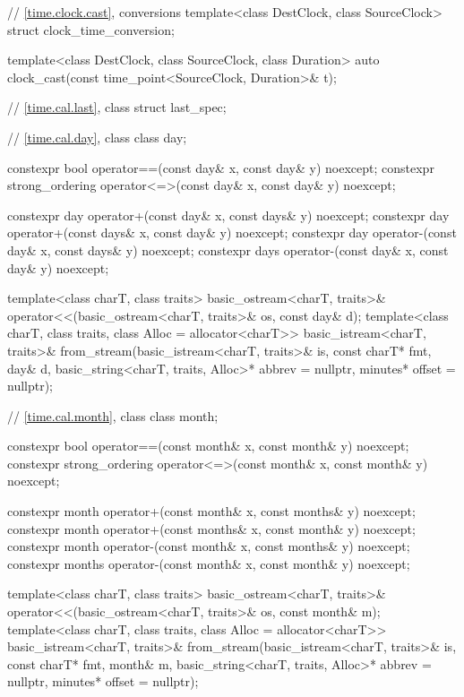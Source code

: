 \begin{codeblock}
{{    // \ref{time.clock.cast},  conversions
    template<class DestClock, class SourceClock>
      struct clock_time_conversion;

    template<class DestClock, class SourceClock, class Duration>
      auto clock_cast(const time_point<SourceClock, Duration>& t);

    // \ref{time.cal.last}, class 
    struct last_spec;

    // \ref{time.cal.day}, class 
    class day;

    constexpr bool operator==(const day& x, const day& y) noexcept;
    constexpr strong_ordering operator<=>(const day& x, const day& y) noexcept;

    constexpr day  operator+(const day&  x, const days& y) noexcept;
    constexpr day  operator+(const days& x, const day&  y) noexcept;
    constexpr day  operator-(const day&  x, const days& y) noexcept;
    constexpr days operator-(const day&  x, const day&  y) noexcept;

    template<class charT, class traits>
      basic_ostream<charT, traits>&
        operator<<(basic_ostream<charT, traits>& os, const day& d);
    template<class charT, class traits, class Alloc = allocator<charT>>
      basic_istream<charT, traits>&
        from_stream(basic_istream<charT, traits>& is, const charT* fmt,
                    day& d, basic_string<charT, traits, Alloc>* abbrev = nullptr,
                    minutes* offset = nullptr);

    // \ref{time.cal.month}, class 
    class month;

    constexpr bool operator==(const month& x, const month& y) noexcept;
    constexpr strong_ordering operator<=>(const month& x, const month& y) noexcept;

    constexpr month  operator+(const month&  x, const months& y) noexcept;
    constexpr month  operator+(const months& x,  const month& y) noexcept;
    constexpr month  operator-(const month&  x, const months& y) noexcept;
    constexpr months operator-(const month&  x,  const month& y) noexcept;

    template<class charT, class traits>
      basic_ostream<charT, traits>&
        operator<<(basic_ostream<charT, traits>& os, const month& m);
    template<class charT, class traits, class Alloc = allocator<charT>>
      basic_istream<charT, traits>&
        from_stream(basic_istream<charT, traits>& is, const charT* fmt,
                    month& m, basic_string<charT, traits, Alloc>* abbrev = nullptr,
                    minutes* offset = nullptr);

}}
\end{codeblock}

